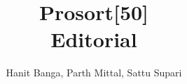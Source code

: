 \documentclass{article}
\title{Prosort[50]\\Editorial}
\author{Hanit Banga, Parth Mittal, Sattu Supari}
\begin{document}
	\maketitle
	\tableofcontents

    \pagebreak
	
    \pagebreak
	
\end{document}
